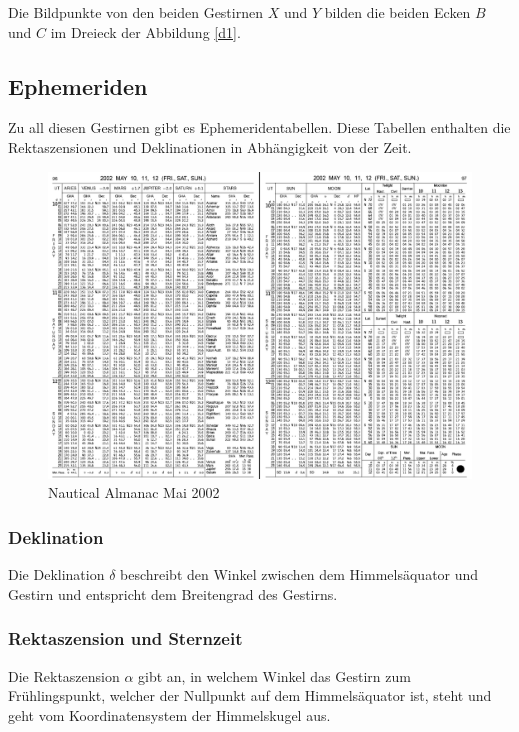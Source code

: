 Die Bildpunkte von den beiden Gestirnen $X$ und $Y$ bilden die beiden Ecken $B$ und $C$ im Dreieck der Abbildung \ref{d1}.
\subsection{Ephemeriden}
\label{ephe}
Zu all diesen Gestirnen gibt es Ephemeridentabellen. 
Diese Tabellen enthalten die Rektaszensionen und Deklinationen in Abhängigkeit von der Zeit.

\begin{figure}
	\begin{center}
		\includegraphics[width=\textwidth]{papers/nav/bilder/ephe.png}
		\caption[Nautical Almanac Mai 2002]{Nautical Almanac Mai 2002}
	\end{center}
\end{figure}

\subsubsection{Deklination}
Die Deklination $\delta$ beschreibt den Winkel zwischen dem Himmelsäquator und Gestirn und entspricht dem Breitengrad des Gestirns.

\subsubsection{Rektaszension und Sternzeit}
Die Rektaszension $\alpha$ gibt an, in welchem Winkel das Gestirn zum Frühlingspunkt, welcher der Nullpunkt auf dem Himmelsäquator ist, steht und geht vom Koordinatensystem der Himmelskugel aus.

